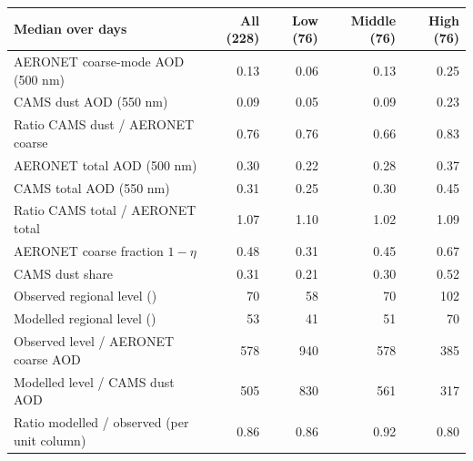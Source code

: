 \begin{tabular}{lrrrr}
\toprule
Median over days & All (228) & Low (76) & Middle (76) & High (76) \\
\midrule
AERONET coarse-mode AOD (500 nm) & 0.13 & 0.06 & 0.13 & 0.25 \\
CAMS dust AOD (550 nm) & 0.09 & 0.05 & 0.09 & 0.23 \\
Ratio CAMS dust / AERONET coarse & 0.76 & 0.76 & 0.66 & 0.83 \\
AERONET total AOD (500 nm) & 0.30 & 0.22 & 0.28 & 0.37 \\
CAMS total AOD (550 nm) & 0.31 & 0.25 & 0.30 & 0.45 \\
Ratio CAMS total / AERONET total & 1.07 & 1.10 & 1.02 & 1.09 \\
AERONET coarse fraction $1-\eta$ & 0.48 & 0.31 & 0.45 & 0.67 \\
CAMS dust share & 0.31 & 0.21 & 0.30 & 0.52 \\
Observed regional level (\ugm{}) & 70 & 58 & 70 & 102 \\
Modelled regional level (\ugm{}) & 53 & 41 & 51 & 70 \\
Observed level / AERONET coarse AOD & 578 & 940 & 578 & 385 \\
Modelled level / CAMS dust AOD & 505 & 830 & 561 & 317 \\
Ratio modelled / observed (per unit column) & 0.86 & 0.86 & 0.92 & 0.80 \\
\bottomrule
\end{tabular}
